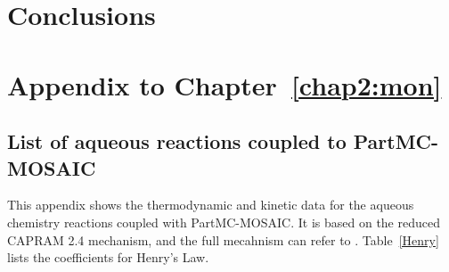 \documentclass[edeposit,fullpage]{uiucthesis2009}
\begin{document}

\chapter{Conclusions}

\appendix
\setcounter{algorithm}{0}

\chapter{Appendix to Chapter~\ref{chap2:mon}}
\label{tab:capram}
\section{List of aqueous reactions coupled to PartMC-MOSAIC}
This appendix shows the thermodynamic and kinetic data for the aqueous chemistry reactions 
coupled with PartMC-MOSAIC. It is based on the reduced CAPRAM 2.4 mechanism, 
and the full mecahnism can refer to \citet{Ervens2003}.
Table~\ref{Henry} lists the coefficients for Henry's Law.
\end{document}
